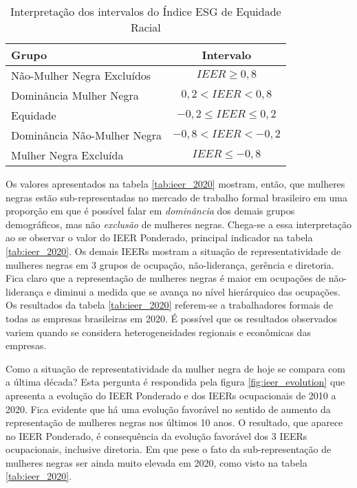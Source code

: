 \documentclass[12pt]{article}
\begin{document}
\begin{table}[htb!]
\centering
\caption{Interpretação dos intervalos do Índice ESG de Equidade Racial}
\begin{tabular}{lc}
\hline
Grupo             & Intervalo                 \\ \hline
Não-Mulher Negra Excluídos & $IEER \geq 0, 8 $               \\
Dominância Mulher Negra  & $0,2 < IEER < 0,8$   \\
Equidade          & $-0,2\leq IEER \leq 0,2$  \\
Dominância Não-Mulher Negra & $-0,8 < IEER < -0,2$ \\
Mulher Negra Excluída  & $IEER \leq -0,8$        \\ \hline
\end{tabular}
\end{table}

\par Os valores apresentados na tabela \ref{tab:ieer_2020} mostram, então, que mulheres negras estão sub-representadas no mercado de trabalho formal brasileiro em uma proporção em que é possível falar em \textit{dominância} dos demais grupos demográficos, mas não \textit{exclusão} de mulheres negras. Chega-se a essa interpretação ao se observar o valor do IEER Ponderado, principal indicador na tabela \ref{tab:ieer_2020}. Os demais IEERs mostram a situação de representatividade de mulheres negras em 3 grupos de ocupação, não-liderança, gerência e diretoria. Fica claro que a representação de mulheres negras é maior em ocupações de não-liderança e diminui a medida que se avança no nível hierárquico das ocupações. Os resultados da tabela \ref{tab:ieer_2020} referem-se a trabalhadores formais de todas as empresas brasileiras em 2020. É possível que os resultados observados variem quando se considera heterogeneidades regionais e econômicas das empresas.



\par Como a situação de representatividade da mulher negra de hoje se compara com a última década? Esta pergunta é respondida pela figura \ref{fig:ieer_evolution} que apresenta a evolução do IEER Ponderado e dos IEERs ocupacionais de 2010 a 2020. Fica evidente que há uma evolução favorável no sentido de aumento da representação de mulheres negras nos últimos 10 anos. O resultado, que aparece no IEER Ponderado, é consequência da evolução favorável dos 3 IEERs ocupacionais, inclusive diretoria. Em que pese o fato da sub-representação de mulheres negras ser ainda muito elevada em 2020, como visto na tabela \ref{tab:ieer_2020}.
\end{document}
